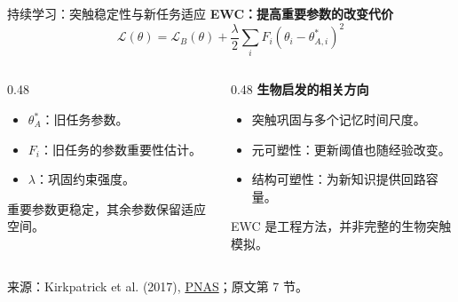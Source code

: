 \documentclass[UTF8,aspectratio=169,10pt,fontset=fandol]{ctexbeamer}
\newcommand{\source}[1]{\par\vfill{\tiny\color{Muted}来源：#1}}
\newcommand{\paper}[2]{\href{#1}{#2}}
\begin{document}
\begin{frame}{持续学习：突触稳定性与新任务适应}
  \textbf{EWC：提高重要参数的改变代价}
  \[
    \mathcal L(\theta)=\mathcal L_B(\theta)
      +\frac{\lambda}{2}\sum_iF_i(\theta_i-\theta^*_{A,i})^2
  \]
  \begin{columns}[T,onlytextwidth]
    \begin{column}{0.48\textwidth}
      \begin{itemize}
        \item $\theta_A^*$：旧任务参数。
        \item $F_i$：旧任务的参数重要性估计。
        \item $\lambda$：巩固约束强度。
      \end{itemize}
      重要参数更稳定，其余参数保留适应空间。
    \end{column}
    \begin{column}{0.48\textwidth}
      \textbf{生物启发的相关方向}
      \begin{itemize}
        \item 突触巩固与多个记忆时间尺度。
        \item 元可塑性：更新阈值也随经验改变。
        \item 结构可塑性：为新知识提供回路容量。
      \end{itemize}
      \alert{EWC 是工程方法，并非完整的生物突触模拟。}
    \end{column}
  \end{columns}
  \source{Kirkpatrick et al. (2017), \paper{https://doi.org/10.1073/pnas.1611835114}{PNAS}；原文第 7 节。}
\end{frame}
\end{document}
